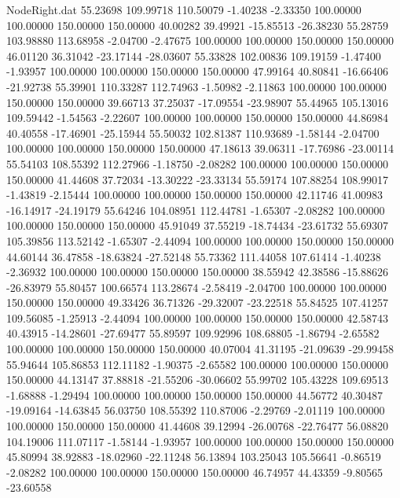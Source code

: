 \begin{filecontents}{NodeRight.dat}
  55.23698  109.99718  110.50079    -1.40238   -2.33350  100.00000  100.00000  150.00000  150.00000   40.00282   39.49921  -15.85513  -26.38230
  55.28759  103.98880  113.68958    -2.04700   -2.47675  100.00000  100.00000  150.00000  150.00000   46.01120   36.31042  -23.17144  -28.03607
  55.33828  102.00836  109.19159    -1.47400   -1.93957  100.00000  100.00000  150.00000  150.00000   47.99164   40.80841  -16.66406  -21.92738
  55.39901  110.33287  112.74963    -1.50982   -2.11863  100.00000  100.00000  150.00000  150.00000   39.66713   37.25037  -17.09554  -23.98907
  55.44965  105.13016  109.59442    -1.54563   -2.22607  100.00000  100.00000  150.00000  150.00000   44.86984   40.40558  -17.46901  -25.15944
  55.50032  102.81387  110.93689    -1.58144   -2.04700  100.00000  100.00000  150.00000  150.00000   47.18613   39.06311  -17.76986  -23.00114
  55.54103  108.55392  112.27966    -1.18750   -2.08282  100.00000  100.00000  150.00000  150.00000   41.44608   37.72034  -13.30222  -23.33134
  55.59174  107.88254  108.99017    -1.43819   -2.15444  100.00000  100.00000  150.00000  150.00000   42.11746   41.00983  -16.14917  -24.19179
  55.64246  104.08951  112.44781    -1.65307   -2.08282  100.00000  100.00000  150.00000  150.00000   45.91049   37.55219  -18.74434  -23.61732
  55.69307  105.39856  113.52142    -1.65307   -2.44094  100.00000  100.00000  150.00000  150.00000   44.60144   36.47858  -18.63824  -27.52148
  55.73362  111.44058  107.61414    -1.40238   -2.36932  100.00000  100.00000  150.00000  150.00000   38.55942   42.38586  -15.88626  -26.83979
  55.80457  100.66574  113.28674    -2.58419   -2.04700  100.00000  100.00000  150.00000  150.00000   49.33426   36.71326  -29.32007  -23.22518
  55.84525  107.41257  109.56085    -1.25913   -2.44094  100.00000  100.00000  150.00000  150.00000   42.58743   40.43915  -14.28601  -27.69477
  55.89597  109.92996  108.68805    -1.86794   -2.65582  100.00000  100.00000  150.00000  150.00000   40.07004   41.31195  -21.09639  -29.99458
  55.94644  105.86853  112.11182    -1.90375   -2.65582  100.00000  100.00000  150.00000  150.00000   44.13147   37.88818  -21.55206  -30.06602
  55.99702  105.43228  109.69513    -1.68888   -1.29494  100.00000  100.00000  150.00000  150.00000   44.56772   40.30487  -19.09164  -14.63845
  56.03750  108.55392  110.87006    -2.29769   -2.01119  100.00000  100.00000  150.00000  150.00000   41.44608   39.12994  -26.00768  -22.76477
  56.08820  104.19006  111.07117    -1.58144   -1.93957  100.00000  100.00000  150.00000  150.00000   45.80994   38.92883  -18.02960  -22.11248
  56.13894  103.25043  105.56641    -0.86519   -2.08282  100.00000  100.00000  150.00000  150.00000   46.74957   44.43359   -9.80565  -23.60558

\end{filecontents}
